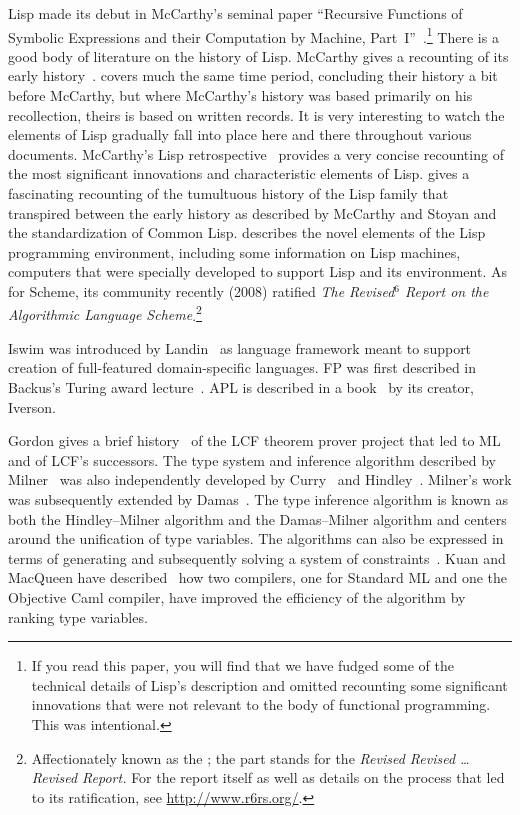Lisp made its debut in McCarthy's seminal paper ``Recursive Functions of Symbolic Expressions and their Computation by Machine, Part~I''~\citep{McCarthy:Recursive:1960}.\footnote{If you read this paper, you will find that we have fudged some of the technical details of Lisp's description and omitted recounting some significant innovations that were not relevant to the body of functional programming. This was intentional.} There is a good body of literature on the history of Lisp. McCarthy gives a recounting of its early history~\citep{McCarthy:History:1978}.  covers much the same time period, concluding their history a bit before McCarthy, but where McCarthy's history was based primarily on his recollection, theirs is based on written records. It is very interesting to watch the elements of Lisp gradually fall into place here and there throughout various documents. McCarthy's Lisp retrospective~\citep{McCarthy:LISP:1980} provides a very concise recounting of the most significant innovations and characteristic elements of Lisp.  gives a fascinating recounting of the tumultuous history of the Lisp family that transpired between the early history as described by McCarthy and Stoyan and the standardization of Common Lisp.  describes the novel elements of the Lisp programming environment, including some information on Lisp machines, computers that were specially developed to support Lisp and its environment. As for Scheme, its community recently (2008) ratified \textit{The Revised$^{6}$ Report on the Algorithmic Language Scheme}.\footnote{Affectionately known as the ; the  part stands for the \textit{Revised Revised \dots Revised Report.} For the report itself as well as details on the process that led to its ratification, see \url{http://www.r6rs.org/}.}

Iswim was introduced by Landin~\citep{Landin:The-next:1966} as language framework meant to support creation of full-featured domain-specific languages. FP was first described in Backus's Turing award lecture~\citep{Backus:Can-programming:1978}. APL is described in a book~\citep{Iverson:A-programming:1962} by its creator, Iverson.

Gordon gives a brief history~\citep{Gordon:From:2000} of the LCF theorem prover project that led to ML and of LCF's successors. The type system and inference algorithm described by Milner~\citep{Milner:A-theory:1978} was also independently developed by Curry~\citep{Curry:Modified:1969} and Hindley~\citep{Hindley:The-principal:1969}. Milner's work was subsequently extended by Damas~\citep{Damas:Principal:1982}. The type inference algorithm is known as both the Hindley--Milner algorithm and the Damas--Milner algorithm and centers around the unification of type variables. The algorithms can also be expressed in terms of generating and subsequently solving a system of constraints~\citep{Pottier:A-modern:2005}. Kuan and MacQueen have described~\citep{Kuan:Efficient:2007} how two compilers, one for Standard ML and one the Objective Caml compiler, have improved the efficiency of the algorithm by ranking type variables.

